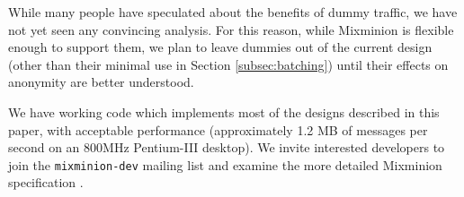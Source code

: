 \documentclass[11pt]{IEEEtran}
\begin{document}
\begin{itemize}
\quad While many people have speculated about the benefits of dummy traffic,
we have not yet seen any convincing analysis. For this reason, while
Mixminion is flexible enough to support them, we plan to leave dummies
out of the current design (other than their minimal use in Section
\ref{subsec:batching}) until their effects on anonymity are better
understood.
\end{itemize}

We have working code which implements most of the designs described in this
paper, with acceptable performance (approximately 1.2 MB of messages per
second on an 800MHz Pentium-III desktop).  We invite interested developers to
join the {\tt mixminion-dev} mailing list and examine the more detailed
Mixminion specification \cite{mixminion-spec}.







\end{document}
